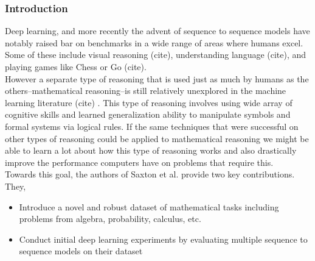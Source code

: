 












\subsubsection{Introduction}

Deep learning, and more recently the advent of sequence to sequence models have notably raised bar on benchmarks in a wide range of 
areas where humans excel. Some of these include visual reasoning (cite), understanding language (cite), and playing games like Chess or Go (cite). \\ 

However a separate type of reasoning that is used just as much by humans as the others--mathematical reasoning--is still relatively unexplored in the machine learning literature (cite) . This type of reasoning involves using  wide array of cognitive skills and learned generalization ability to manipulate symbols and formal systems via logical rules. If the same techniques that were successful on other types of reasoning could be applied to mathematical reasoning we might be able to learn a lot about how this type of reasoning works and also drastically improve the performance computers have on problems that require this. \\ 


Towards this goal, the authors of Saxton et al. \supercite{DBLP:journals/corr/abs-1904-01557}  provide two key contributions. They, 

\begin{itemize}
   \item Introduce a novel and robust dataset of mathematical tasks including problems from algebra, probability, calculus, etc.
   \item Conduct initial deep learning experiments by evaluating multiple sequence to sequence models on their dataset 
\end{itemize}

